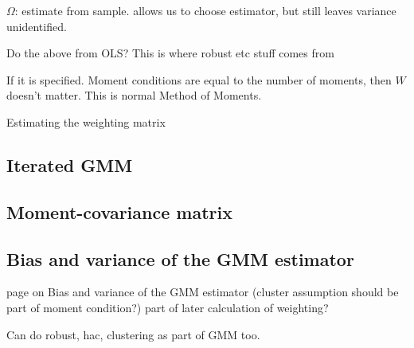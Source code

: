 \(\Omega \): estimate from sample. allows us to choose estimator, but still leaves variance unidentified.

Do the above from OLS? This is where robust etc stuff comes from

If it is specified. Moment conditions are equal to the number of moments, then \(W\) doesn't matter. This is normal Method of Moments.

Estimating the weighting matrix

\subsection{Iterated GMM}

\subsection{Moment-covariance matrix}

\subsection{Bias and variance of the GMM estimator}

page on Bias and variance of the GMM estimator (cluster assumption should be part of moment condition?) part of later calculation of weighting?

Can do robust, hac, clustering as part of GMM too.

